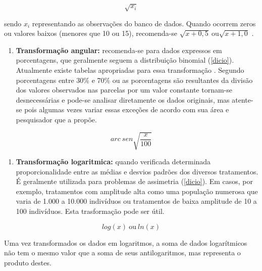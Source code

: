 \documentclass[
  openany]{book}
\providecommand{\tightlist}{%
  \setlength{\itemsep}{0pt}\setlength{\parskip}{0pt}}
\begin{document}
\begin{equation}
\sqrt{x_i}
\label{eq:transraiz}
\end{equation}

sendo \(x_i\) representando as observações do banco de dados. Quando ocorrem zeros ou valores baixos (menores que 10 ou 15), recomenda-se \(\sqrt{x+0,5} \ \mbox{ou} \sqrt{x+1,0}\) \citep{banzatto1992experimentaccao}.

\begin{enumerate}
\def\labelenumi{\arabic{enumi}.}
\setcounter{enumi}{2}
\tightlist
\item
  \textbf{Transformação angular:} recomenda-se para dados expressos em porcentagens, que geralmente seguem a distribuição binomial (\ref{dicio}). Atualmente existe tabelas apropriadas para essa transformação \citep{banzatto1992experimentaccao}. Segundo \citet{banzatto1992experimentaccao} porcentagens entre 30\% e 70\% ou as porcentagens são resultantes da divisão dos valores observados nas parcelas por um valor constante tornam-se desnecessárias e pode-se analisar diretamente os dados originais, mas atente-se pois algumas vezes variar essas exceções de acordo com sua área e pesquisador que a propõe.
\end{enumerate}

\begin{equation}
arc \ sen \sqrt{\frac{x}{100}}
\label{eq:transang}
\end{equation}

\begin{enumerate}
\def\labelenumi{\arabic{enumi}.}
\setcounter{enumi}{3}
\tightlist
\item
  \textbf{Transformação logaritmica:} quando verificada determinada proporcionalidade entre as médias e desvios padrões dos diversos tratamentos. É geralmente utilizada para problemas de assimetria (\ref{dicio}). Em casos, por exemplo, tratamentos com amplitude alta como uma população numerosa que varia de 1.000 a 10.000 indivíduos ou tratamentos de baixa amplitude de 10 a 100 indivíduos. Esta trasformação pode ser útil.
\end{enumerate}

\begin{equation}
log(x) \ \mbox{ou} \ ln(x)
\label{eq:translog}
\end{equation}

Uma vez transformados os dados em logaritmos, a soma de dados logarítmicos não tem o mesmo valor que a soma de seus antilogaritmos, mas representa o produto destes.
\end{document}

